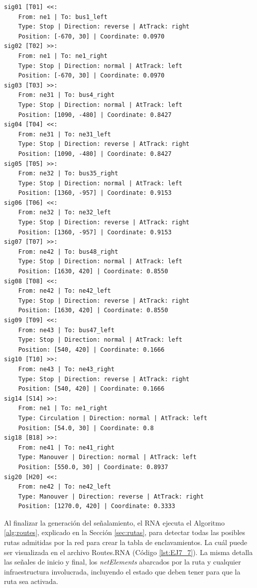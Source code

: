 	\begin{lstlisting}[language = {}, caption = Signalling.RNA, label = {lst:EJ7_6}]
sig01 [T01] <<:
	From: ne1 | To: bus1_left
	Type: Stop | Direction: reverse | AtTrack: right 
	Position: [-670, 30] | Coordinate: 0.0970
sig02 [T02] >>:
	From: ne1 | To: ne1_right
	Type: Stop | Direction: normal | AtTrack: left 
	Position: [-670, 30] | Coordinate: 0.0970
sig03 [T03] >>:
	From: ne31 | To: bus4_right
	Type: Stop | Direction: normal | AtTrack: left 
	Position: [1090, -480] | Coordinate: 0.8427
sig04 [T04] <<:
	From: ne31 | To: ne31_left
	Type: Stop | Direction: reverse | AtTrack: right 
	Position: [1090, -480] | Coordinate: 0.8427
sig05 [T05] >>:
	From: ne32 | To: bus35_right
	Type: Stop | Direction: normal | AtTrack: left 
	Position: [1360, -957] | Coordinate: 0.9153
sig06 [T06] <<:
	From: ne32 | To: ne32_left
	Type: Stop | Direction: reverse | AtTrack: right 
	Position: [1360, -957] | Coordinate: 0.9153
sig07 [T07] >>:
	From: ne42 | To: bus48_right
	Type: Stop | Direction: normal | AtTrack: left 
	Position: [1630, 420] | Coordinate: 0.8550
sig08 [T08] <<:
	From: ne42 | To: ne42_left
	Type: Stop | Direction: reverse | AtTrack: right 
	Position: [1630, 420] | Coordinate: 0.8550
sig09 [T09] <<:
	From: ne43 | To: bus47_left
	Type: Stop | Direction: normal | AtTrack: left 
	Position: [540, 420] | Coordinate: 0.1666
sig10 [T10] >>:
	From: ne43 | To: ne43_right
	Type: Stop | Direction: reverse | AtTrack: right 
	Position: [540, 420] | Coordinate: 0.1666
sig14 [S14] >>:
	From: ne1 | To: ne1_right
	Type: Circulation | Direction: normal | AtTrack: left 
	Position: [54.0, 30] | Coordinate: 0.8
sig18 [B18] >>:
	From: ne41 | To: ne41_right
	Type: Manouver | Direction: normal | AtTrack: left 
	Position: [550.0, 30] | Coordinate: 0.8937
sig20 [H20] <<:
	From: ne42 | To: ne42_left
	Type: Manouver | Direction: reverse | AtTrack: right 
	Position: [1270.0, 420] | Coordinate: 0.3333
	\end{lstlisting}
	
	Al finalizar la generación del señalamiento, el RNA ejecuta el Algoritmo \ref{alg:routes}, explicado en la Sección \ref{sec:rutas}, para detectar todas las posibles rutas admitidas por la red para crear la tabla de enclavamientos. La cuál puede ser visualizada en el archivo Routes.RNA (Código \ref{lst:EJ7_7}). La misma detalla las señales de inicio y final, los \textit{netElements} abarcados por la ruta y cualquier infraestructura involucrada, incluyendo el estado que deben tener para que la ruta sea activada.
	

